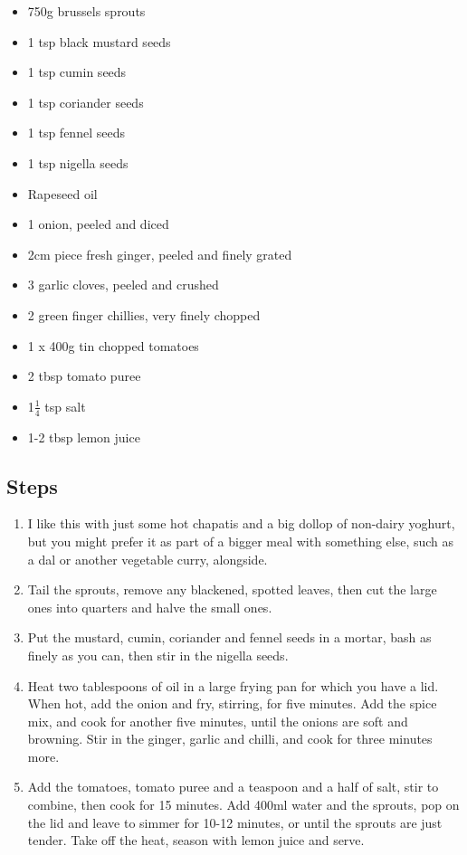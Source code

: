 \documentclass{book}
\begin{document}
\begin{itemize}
\item 750g brussels sprouts 
\item 1 tsp black mustard seeds 
\item 1 tsp cumin seeds 
\item 1 tsp coriander seeds 
\item 1 tsp fennel seeds 
\item 1 tsp nigella seeds 
\item Rapeseed oil
\item 1 onion, peeled and diced
\item 2cm piece fresh ginger, peeled and finely grated 
\item 3 garlic cloves, peeled and crushed 
\item 2 green finger chillies, very finely chopped 
\item 1 x 400g tin chopped tomatoes 
\item 2 tbsp tomato puree
\item 1$\frac{1}{4}$ tsp salt
\item 1-2 tbsp lemon juice
\end{itemize}

\subsection*{Steps}
\begin{enumerate}
\item I like this with just some hot chapatis and a big dollop of non-dairy yoghurt, but you might prefer it as part of a bigger meal with something else, such as a dal or another vegetable curry, alongside.
\item Tail the sprouts, remove any blackened, spotted leaves, then cut the large ones into quarters and halve the small ones. 
\item Put the mustard, cumin, coriander and fennel seeds in a mortar, bash as finely as you can, then stir in the nigella seeds.
\item Heat two tablespoons of oil in a large frying pan for which you have a lid. When hot, add the onion and fry, stirring, for five minutes. Add the spice mix, and cook for another five minutes, until the onions are soft and browning. Stir in the ginger, garlic and chilli, and cook for three minutes more.
\item Add the tomatoes, tomato puree and a teaspoon and a half of salt, stir to combine, then cook for 15 minutes. Add 400ml water and the sprouts, pop on the lid and leave to simmer for 10-12 minutes, or until the sprouts are just tender. Take off the heat, season with lemon juice and serve.
\end{enumerate}
\newpage
\end{document}
